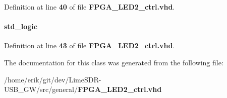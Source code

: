 Definition at line {\bf 40} of file {\bf F\+P\+G\+A\+\_\+\+L\+E\+D2\+\_\+ctrl.\+vhd}.

\paragraph[{led\+\_\+r\+\_\+ovr}]{ {\bfseries \textcolor{comment}{std\+\_\+logic}\textcolor{vhdlchar}{ }} \hspace{0.3cm}{\ttfamily [Signal]}}\label{classFPGA__LED2__ctrl_1_1arch_a67886c5045d27f249f9daa43213ebecd}


Definition at line {\bf 43} of file {\bf F\+P\+G\+A\+\_\+\+L\+E\+D2\+\_\+ctrl.\+vhd}.



The documentation for this class was generated from the following file\+:\begin{DoxyCompactItemize}
\item 
/home/erik/git/dev/\+Lime\+S\+D\+R-\/\+U\+S\+B\+\_\+\+G\+W/src/general/{\bf F\+P\+G\+A\+\_\+\+L\+E\+D2\+\_\+ctrl.\+vhd}\end{DoxyCompactItemize}
